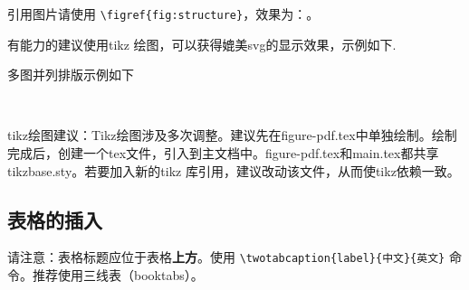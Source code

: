 \begin{figure}[H]
  \centering

\end{figure}

引用图片请使用 \verb|\figref{fig:structure}|，效果为：。

有能力的建议使用tikz 绘图，可以获得媲美svg的显示效果，示例如下.

\begin{figure}[H]
  \centering
  
\end{figure}

多图并列排版示例如下

\begin{figure}[H]
  \centering
  \begin{minipage}[t]{0.45\linewidth}
    \centering
    \resizebox{\textwidth}{!}{}
  \end{minipage}%
  ~
  \begin{minipage}[t]{0.45\linewidth}
    \centering
    \resizebox{\textwidth}{!}{
    }
  \end{minipage}
\end{figure}

tikz绘图建议：Tikz绘图涉及多次调整。建议先在figure-pdf.tex中单独绘制。绘制完成后，创建一个tex文件，引入到主文档中。figure-pdf.tex和main.tex都共享tikzbase.sty。若要加入新的tikz 库引用，建议改动该文件，从而使tikz依赖一致。

\subsection{表格的插入}
请注意：表格标题应位于表格\textbf{上方}。使用 \verb|\twotabcaption{label}{中文}{英文}| 命令。推荐使用三线表（booktabs）。

